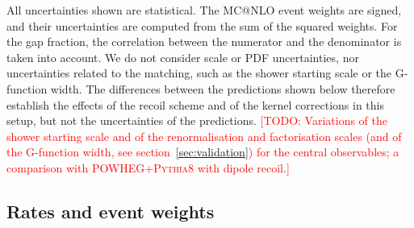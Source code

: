 \documentclass[a4paper,11pt]{article}
\makeatletter
\newcommand{\mcatnlo}{MC@NLO\xspace}
\newcommand{\pythia}{\textsc{Pythia8}\xspace}
\newcommand{\todo}[1]{\textcolor{red}{[TODO: #1]}}
\makeatother
\begin{document}
All uncertainties shown are statistical. The \mcatnlo event weights
are signed, and their uncertainties are computed from the sum of the
squared weights. For the gap fraction, the correlation between the
numerator and the denominator is taken into account. We do not
consider scale or PDF uncertainties, nor uncertainties related to the
matching, such as the shower starting scale or the G-function width.
The differences between the predictions shown below therefore
establish the effects of the recoil scheme and of the kernel
corrections in this setup, but not the uncertainties of the
predictions. \todo{Variations of the shower starting scale and of the
  renormalisation and factorisation scales (and of the G-function
  width, see section~\ref{sec:validation}) for the central observables;
  a comparison with POWHEG+\pythia with dipole recoil.}

\subsection{Rates and event weights}
\label{sec:rates}
\end{document}
